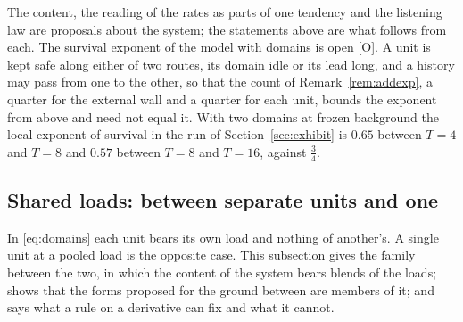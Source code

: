 \begin{remark}\label{rem:domainsscope}
The content, the reading of the rates as parts of one tendency and the
listening law are proposals about the system; the statements above are
what follows from each. The survival exponent of the model with domains
is open [O]. A unit is kept safe along either of two routes, its domain
idle or its lead long, and a history may pass from one to the other, so
that the count of Remark~\ref{rem:addexp}, a quarter for the external
wall and a quarter for each unit, bounds the exponent from above and need
not equal it. With two domains at frozen background the local exponent of
survival in the run of Section~\ref{sec:exhibit} is $0.65$ between $T=4$
and $T=8$ and $0.57$ between $T=8$ and $T=16$, against $\tfrac34$.
\end{remark}


\subsection{Shared loads: between separate units and one}\label{sec:sharing}

In \eqref{eq:domains} each unit bears its own load and nothing of
another's. A single unit at a pooled load is the opposite case. This
subsection gives the family between the two, in which the content of the
system bears blends of the loads; shows that the forms proposed for the
ground between are members of it; and says what a rule on a derivative
can fix and what it cannot.

